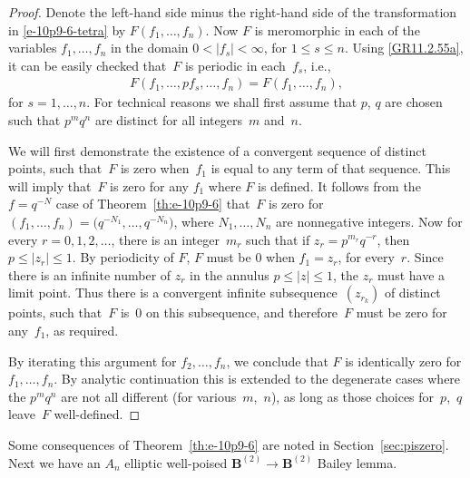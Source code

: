 \documentclass[pdftex]{sigma}
\numberwithin{equation}{section}
\newcommand{\B}{{ \mathbf B}}
\begin{document}
\begin{proof} Denote the left-hand side minus the right-hand side of the transformation in \eqref{e-10p9-6-tetra} by $F(f_1,\dots,f_n)$. Now $F$ is meromorphic in each of the variables $f_1,\dots,f_n$ in the domain $0<|f_s|<\infty$, for $1\le s\le n$. Using \eqref{GR11.2.55a}, it can be easily checked that~$F$ is periodic in each~$f_s$, i.e.,
\begin{gather*}
F(f_1,\dots,pf_s,\dots,f_n)=F(f_1,\dots,f_n),
\end{gather*}
for $s=1,\dots,n$. For technical reasons we shall first assume that $p$, $q$ are chosen such that $p^mq^n$ are distinct for all integers~$m$ and~$n$.

We will first demonstrate the existence of a convergent sequence of distinct points, such that~$F$ is zero when~$f_1$ is equal to any term of that sequence. This will imply that~$F$ is zero for any $f_1$ where $F$ is defined. It follows from the $f=q^{-N}$ case of Theorem~\ref{th:e-10p9-6}
that~$F$ is zero for $(f_1,\dots,f_n)=\big(q^{-N_1},\dots,q^{-N_n}\big)$, where $N_1,\dots,N_n$ are nonnegative integers. Now for every $r=0, 1, 2, \dots$, there is an integer~$m_r$ such that if $z_r = p^{m_r}q^{-r}$, then $p\le |z_r| \le 1$. By periodicity of $F$, $F$ must be $0$ when $f_1=z_r$, for every~$r$. Since there is an infinite number of $z_r$ in the annulus $p\le |z|\le 1$, the $z_r$ must have a limit point. Thus there is a convergent infinite subsequen\-ce~$(z_{r_k})$ of distinct points, such that~$F$ is~$0$ on this subsequence, and therefore~$F$ must be zero for any~$f_1$, as required.

By iterating this argument for $f_2,\dots,f_n$, we conclude that $F$ is identically zero for $f_1,\dots,f_n$. By analytic continuation this is extended to the degenerate cases where the $p^mq^n$ are not all different (for various~$m$,~$n$), as long as those choices for~$p$,~$q$ leave~$F$ well-defined.
\end{proof}

Some consequences of Theorem~\ref{th:e-10p9-6} are noted in Section~\ref{sec:piszero}. Next we have an $A_n$ elliptic well-poised $\B^{(2)} \to\B^{(2)}$ Bailey lemma.
\end{document}
